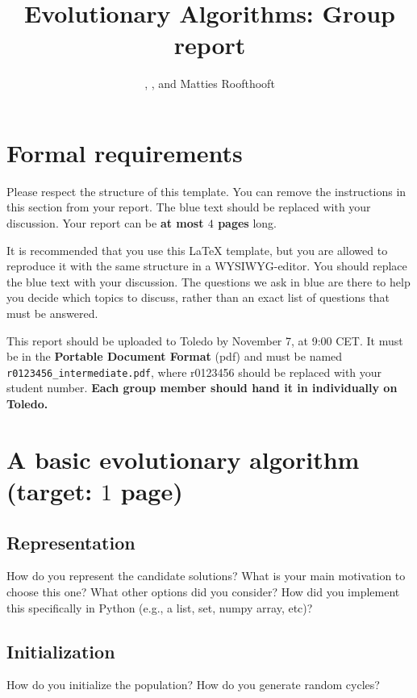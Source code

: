 \documentclass[a4paper,10pt]{article}
\title{\vspace{-2cm}Evolutionary Algorithms: Group report}
\author{\ReplaceMe{Group Member 1}, \ReplaceMe{Group Member 2}, and Matties Roofthooft}
\newcommand{\thisyear}{\the\year}
\newcommand{\deadlineGroup}{November 7, \thisyear{} at 9:00 CET}
\newcommand{\ReplaceMe}[1]{{\color{blue}#1}}
\newcommand{\RemoveMe}[1]{{\color{purple}#1}}
\begin{document}
\selectfont{}

\maketitle

\RemoveMe{
\section*{Formal requirements}

Please respect the structure of this template. You can remove the instructions in this section from your report. The blue text should be replaced with your discussion. Your report can be \textbf{at most $4$ pages} long. 

It is recommended that you use this \LaTeX{} template, but you are allowed to reproduce it with the same structure in a WYSIWYG-editor. You should replace the blue text with your discussion. The questions we ask in blue are there to help you decide which topics to discuss, rather than an exact list of questions that must be answered.

This report should be uploaded to Toledo by \deadlineGroup. It must be in the \textbf{Portable Document Format} (pdf) and must be named \texttt{r0123456\_intermediate.pdf}, where r0123456 should be replaced with your student number. \textbf{Each group member should hand it in individually on Toledo.}
}

\section{A basic evolutionary algorithm \hfill(target: $1$ page)} 

\subsection{Representation}

\ReplaceMe{How do you represent the candidate solutions? What is your main motivation to choose this one? What other options did you consider? How did you implement this specifically in Python (e.g., a list, set, numpy array, etc)?}

\subsection{Initialization}

\ReplaceMe{How do you initialize the population? How do you generate random cycles?}
\end{document}
